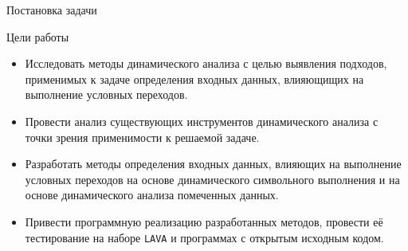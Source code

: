\documentclass[10pt]{beamer}
\begin{document}
\begin{frame}{Постановка задачи}

Цели работы
\begin{itemize}
    \item Исследовать методы динамического анализа с целью выявления подходов, применимых к задаче определения входных данных, влияющищих на выполнение условных переходов.
    \item Провести анализ существующих инструментов динамического анализа с точки зрения применимости к решаемой задаче.
    \item Разработать методы определения входных данных, влияющих на выполнение условных переходов на основе динамического символьного выполнения и на основе динамического анализа помеченных данных.
    \item Привести программную реализацию разработанных методов, провести её тестирование на наборе \texttt{LAVA} и программах с открытым исходным кодом.
\end{itemize}



\end{frame}
\end{document}
